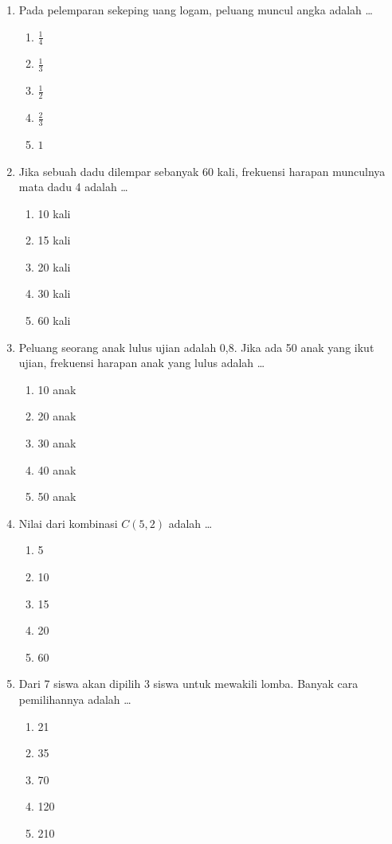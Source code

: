 \documentclass[12pt,a4paper]{article}
\begin{document}
\begin{enumerate}[leftmargin=*]
\item Pada pelemparan sekeping uang logam, peluang muncul angka adalah \dots
    \begin{enumerate}[label=\alph*.]
        \item $\frac{1}{4}$
        \item $\frac{1}{3}$
        \item $\frac{1}{2}$
        \item $\frac{2}{3}$
        \item $1$
    \end{enumerate}

\item Jika sebuah dadu dilempar sebanyak 60 kali, frekuensi harapan munculnya mata dadu 4 adalah \dots
    \begin{enumerate}[label=\alph*.]
        \item 10 kali
        \item 15 kali
        \item 20 kali
        \item 30 kali
        \item 60 kali
    \end{enumerate}

\item Peluang seorang anak lulus ujian adalah 0,8. Jika ada 50 anak yang ikut ujian, frekuensi harapan anak yang lulus adalah \dots
    \begin{enumerate}[label=\alph*.]
        \item 10 anak
        \item 20 anak
        \item 30 anak
        \item 40 anak
        \item 50 anak
    \end{enumerate}

\item Nilai dari kombinasi $C(5, 2)$ adalah \dots
    \begin{enumerate}[label=\alph*.]
        \item 5
        \item 10
        \item 15
        \item 20
        \item 60
    \end{enumerate}

\item Dari 7 siswa akan dipilih 3 siswa untuk mewakili lomba. Banyak cara pemilihannya adalah \dots
    \begin{enumerate}[label=\alph*.]
        \item 21
        \item 35
        \item 70
        \item 120
        \item 210
    \end{enumerate}


\end{enumerate}
\end{document}
